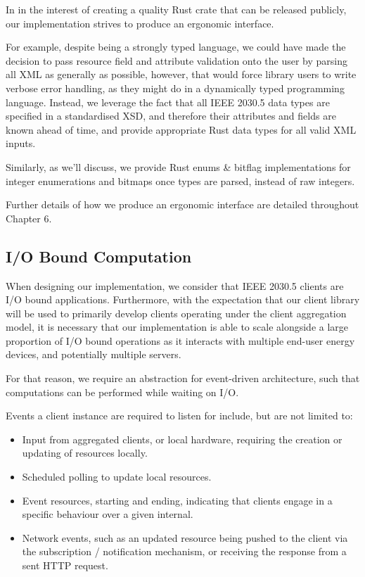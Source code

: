 In in the interest of creating a quality Rust crate that can be released publicly, our implementation strives to produce an ergonomic interface. 

For example, despite being a strongly typed language, we could have made the decision to pass resource field and attribute validation onto the user by parsing all XML as generally as possible, however, that would force library users to write verbose error handling, as they might do in a dynamically typed programming language. Instead, we leverage the fact that all IEEE 2030.5 data types are specified in a standardised XSD, and therefore their attributes and fields are known ahead of time, and provide appropriate Rust data types for all valid XML inputs.

Similarly, as we'll discuss, we provide Rust enums \& bitflag implementations for integer enumerations and bitmaps once types are parsed, instead of raw integers.

Further details of how we produce an ergonomic interface are detailed throughout Chapter 6.

\subsection{I/O Bound Computation}
When designing our implementation, we consider that IEEE 2030.5 clients are I/O bound applications. Furthermore, with the expectation that our client library will be used to primarily develop clients operating under the client aggregation model, it is necessary that our implementation is able to scale alongside a large proportion of I/O bound operations as it interacts with multiple end-user energy devices, and potentially multiple servers.

For that reason, we require an abstraction for event-driven architecture, such that computations can be performed while waiting on I/O.

Events a client instance are required to listen for include, but are not limited to:

\begin{itemize}
    \item Input from aggregated clients, or local hardware, requiring the creation or updating of resources locally.
    \item Scheduled polling to update local resources.
    \item Event resources, starting and ending, indicating that clients engage in a specific behaviour over a given internal.
    \item Network events, such as an updated resource being pushed to the client via the subscription / notification mechanism, or receiving the response from a sent HTTP request.
\end{itemize}

